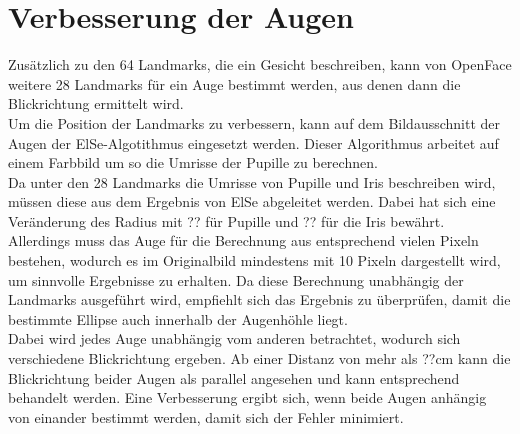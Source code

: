 \section{Verbesserung der Augen}
\label{verbesserung_ElSe}
Zusätzlich zu den 64 Landmarks, die ein Gesicht beschreiben, kann von OpenFace weitere 28 Landmarks für ein Auge bestimmt werden, aus denen dann die Blickrichtung ermittelt wird.\\
Um die Position der Landmarks zu verbessern, kann auf dem Bildausschnitt der Augen der ElSe-Algotithmus eingesetzt werden. Dieser Algorithmus arbeitet auf einem Farbbild um so die Umrisse der Pupille zu berechnen.\\
Da unter den 28 Landmarks die Umrisse von Pupille und Iris beschreiben wird, müssen diese aus dem Ergebnis von ElSe abgeleitet werden. Dabei hat sich eine Veränderung des Radius mit ?? für Pupille und ?? für die Iris bewährt.\\
Allerdings muss das Auge für die Berechnung aus entsprechend vielen Pixeln bestehen, wodurch es im Originalbild mindestens mit 10 Pixeln dargestellt wird, um sinnvolle Ergebnisse zu erhalten. Da diese Berechnung unabhängig der Landmarks ausgeführt wird, empfiehlt sich das Ergebnis zu überprüfen, damit die bestimmte Ellipse auch innerhalb der Augenhöhle liegt.\\
Dabei wird jedes Auge unabhängig vom anderen betrachtet, wodurch sich verschiedene Blickrichtung ergeben. Ab einer Distanz von mehr als ??cm kann die Blickrichtung beider Augen als parallel angesehen und kann entsprechend behandelt werden. Eine Verbesserung ergibt sich, wenn beide Augen anhängig von einander bestimmt werden, damit sich der Fehler minimiert.
